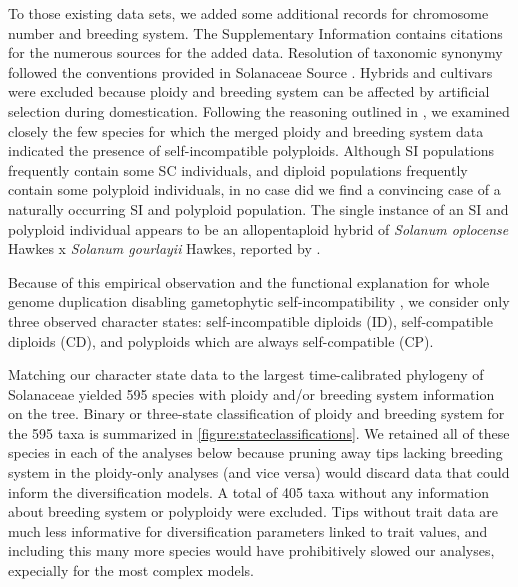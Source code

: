 To those existing data sets, we added some additional records for chromosome number and breeding system.
The Supplementary Information contains citations for the numerous sources for the added data. %
Resolution of taxonomic synonymy followed the conventions provided in Solanaceae Source \citep{solsource}. %
Hybrids and cultivars were excluded because ploidy and breeding system can be affected by artificial selection during domestication. %
Following the reasoning outlined in \citet{robertson_2011}, we examined closely the few species for which the merged ploidy and breeding system data indicated the presence of self-incompatible polyploids.
Although SI populations frequently contain some SC individuals, and diploid populations frequently contain some polyploid individuals, in no case did we find a convincing case of a naturally occurring SI and polyploid population.
The single instance of an SI and polyploid individual appears to be an allopentaploid hybrid of {\em Solanum oplocense} Hawkes x {\em Solanum gourlayii} Hawkes, reported by \citet{camadro_1981}.

Because of this empirical observation and the functional explanation for whole genome duplication disabling gametophytic self-incompatibility \citep[reviewed in][]{ramsey_1998,stone_2002}, we consider only three observed character states: self-incompatible diploids (ID), self-compatible diploids (CD), and polyploids which are always self-compatible (CP).


Matching our character state data to the largest time-calibrated phylogeny of Solanaceae \citep{sarkinen_2013} yielded 595 species with ploidy and/or breeding system information on the tree.
Binary or three-state classification of ploidy and breeding system for the 595 taxa is summarized in \cref{figure:stateclassifications}.
We retained all of these species in each of the analyses below because pruning away tips lacking breeding system in the ploidy-only analyses (and vice versa) would discard data that could inform the diversification models.
A total of 405 taxa without any information about breeding system or polyploidy were excluded.
Tips without trait data are much less informative for diversification parameters linked to trait values, and including this many more species would have prohibitively slowed our analyses, expecially for the most complex models.

